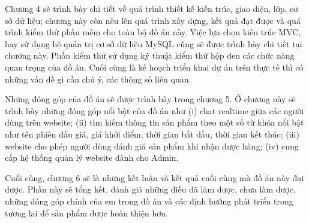 \documentclass[../DoAn.tex]{subfiles}
\begin{document}
Chương 4 sẽ trình bày chi tiết về quá trình thiết kế kiến trúc, giao diện, lớp, cơ sở dữ liệu; chương này còn nêu lên quá trình xây dựng, kết quả đạt được và quá trình kiểm thử phần mềm cho toàn bộ đồ án này. Việc lựa chọn kiến trúc MVC, hay sử dụng hệ quản trị cơ sở dữ liệu MySQL cũng sẽ được trình bày chi tiết tại chương này. Phần kiểm thử sử dụng kỹ thuật kiểm thử hộp đen các chức năng quan trọng của đồ án. Cuối cùng là kế hoạch triển khai dự án trên thực tế thì có những vấn đề gì cần chú ý, các thông số liên quan.

Những đóng góp của đồ án sẽ được trình bày trong chương 5. Ở chương này sẽ trình bày những đóng góp nổi bật của đồ án như (i) chat realtime giữa các người dùng trên website; (ii) tìm kiếm thông tin sản phẩm theo một số từ khóa nổi bật như tên phiên đấu giá, giá khởi điểm, thời gian bắt đầu, thời gian kết thúc; (iii) website cho phép người dùng đánh giá sản phẩm khi nhận được hàng; (iv) cung cấp hệ thống quản lý website dành cho Admin.

Cuối cùng, chương 6 sẽ là những kết luận và kết quả cuối cùng mà đồ án này đạt được. Phần này sẽ tổng kết, đánh giá những điều đã làm được, chưa làm được, những đóng góp chính của em trong đồ án và các định hướng phát triển trong tương lai để sản phẩm được hoàn thiện hơn.
\end{document}
